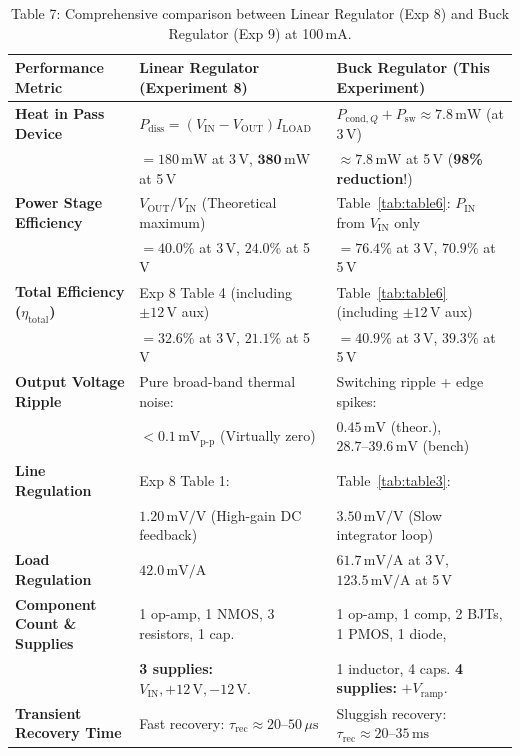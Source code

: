 \documentclass[12pt,a4paper]{article}
\newcommand{\Vout}{V_{\mathrm{OUT}}}
\newcommand{\Vin}{V_{\mathrm{IN}}}
\newcommand{\Vramp}{V_{\mathrm{ramp}}}
\newcommand{\Iload}{I_{\mathrm{LOAD}}}
\newcommand{\Pin}{P_{\mathrm{IN}}}
\begin{document}
\begin{table}[H]
\centering
\small
\caption{Table 7: Comprehensive comparison between Linear Regulator (Exp 8) and Buck Regulator (Exp 9) at 100\,mA.}
\label{tab:table7}
\renewcommand{\arraystretch}{1.3}
\begin{tabularx}{\linewidth}{lXX}
\toprule
\textbf{Performance Metric} & \textbf{Linear Regulator (Experiment 8)} & \textbf{Buck Regulator (This Experiment)} \\
\midrule
\textbf{Heat in Pass Device} & $P_{\mathrm{diss}} = (\Vin - \Vout)\Iload$ & $P_{\mathrm{cond},Q} + P_{\mathrm{sw}} \approx 7.8\,\mathrm{mW}$ (at 3\,V) \\
& $= 180\,\mathrm{mW}$ at 3\,V, $\mathbf{380\,\mathrm{mW}}$ at 5\,V & $\approx \mathbf{7.8\,\mathrm{mW}}$ at 5\,V (\textbf{98\% reduction}!) \\
\midrule
\textbf{Power Stage Efficiency} & $\Vout / \Vin$ (Theoretical maximum) & Table~\ref{tab:table6}: $\Pin$ from $\Vin$ only \\
& $= 40.0\%$ at 3\,V, $\mathbf{24.0\%}$ at 5\,V & $=\mathbf{76.4\%}$ at 3\,V, $\mathbf{70.9\%}$ at 5\,V \\
\midrule
\textbf{Total Efficiency ($\eta_{\mathrm{total}}$)} & Exp 8 Table 4 (including $\pm12\,\mathrm{V}$ aux) & Table~\ref{tab:table6} (including $\pm12\,\mathrm{V}$ aux) \\
& $= 32.6\%$ at 3\,V, $\mathbf{21.1\%}$ at 5\,V & $=\mathbf{40.9\%}$ at 3\,V, $\mathbf{39.3\%}$ at 5\,V \\
\midrule
\textbf{Output Voltage Ripple} & Pure broad-band thermal noise: & Switching ripple + edge spikes: \\
& $< 0.1\,\mathrm{mV_{p\text{-}p}}$ (Virtually zero) & $0.45\,\mathrm{mV}$ (theor.), $28.7\text{--}39.6\,\mathrm{mV}$ (bench) \\
\midrule
\textbf{Line Regulation} & Exp 8 Table 1: & Table~\ref{tab:table3}: \\
& $\mathbf{1.20\,\mathrm{mV/V}}$ (High-gain DC feedback) & $\mathbf{3.50\,\mathrm{mV/V}}$ (Slow integrator loop) \\
\midrule
\textbf{Load Regulation} & $42.0\,\mathrm{mV/A}$ & $61.7\,\mathrm{mV/A}$ at 3\,V, $123.5\,\mathrm{mV/A}$ at 5\,V \\
\midrule
\textbf{Component Count \& Supplies} & 1 op-amp, 1 NMOS, 3 resistors, 1 cap. & 1 op-amp, 1 comp, 2 BJTs, 1 PMOS, 1 diode, \\
& \textbf{3 supplies:} $\Vin, +12\,\mathrm{V}, -12\,\mathrm{V}$. & 1 inductor, 4 caps. \textbf{4 supplies:} $+\Vramp$. \\
\midrule
\textbf{Transient Recovery Time} & Fast recovery: $\tau_{\mathrm{rec}} \approx 20\text{--}50\,\mu\mathrm{s}$ & Sluggish recovery: $\tau_{\mathrm{rec}} \approx 20\text{--}35\,\mathrm{ms}$ \\
\bottomrule
\end{tabularx}
\end{table}
\end{document}
